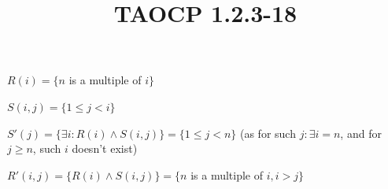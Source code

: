 \documentclass{article}
\title{TAOCP 1.2.3\mbox{-}18}
\begin{document}
\maketitle

\( R(i) = \{ n \) is a multiple of \( i \} \)

\( S(i,j) = \{ 1 \leq j < i \} \)

\( S'(j) = \{ \exists i: R(i) \land S(i,j) \} = \{ 1 \leq j < n \} \) (as for such \( j: \exists i = n \), and for \( j \geq n \), such \( i \) doesn't exist)

\( R'(i,j) = \{ R(i) \land S(i,j) \} = \{ n \) is a multiple of \( i, i > j \} \)
\end{document}
